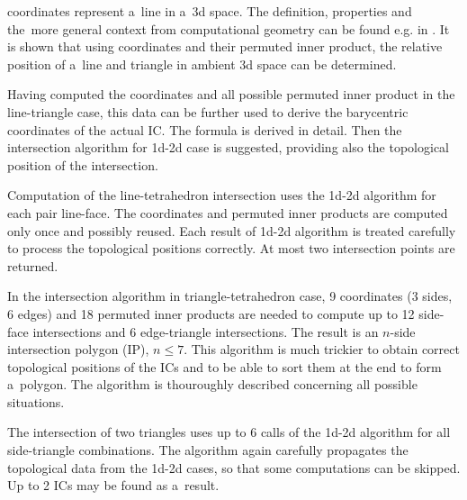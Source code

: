 \plucker coordinates represent a~line in a~3d space. The definition, properties and the~more general context from computational 
geometry can be found e.g. in \cite{joswig_plucker_2013}.
It is shown that using \plucker coordinates and their permuted inner product, the relative position of a~line and triangle
in ambient 3d space can be determined.


Having computed the \plucker coordinates and all possible permuted inner product in the line-triangle case,
this data can be further used to derive the barycentric coordinates of the actual IC.
The formula is derived in detail.
Then the intersection algorithm for 1d-2d case is suggested, providing also the topological position of the intersection.


Computation of the line-tetrahedron intersection uses the 1d-2d algorithm for each pair line-face.
The \plucker coordinates and permuted inner products are computed only once and possibly reused.
Each result of 1d-2d algorithm is treated carefully to process the topological positions correctly.
At most two intersection points are returned.


In the intersection algorithm in triangle-tetrahedron case, 9 \plucker coordinates (3 sides, 6 edges) and 18 permuted inner products
are needed to compute up to 12 side-face intersections and 6 edge-triangle intersections.
The result is an $n$-side intersection polygon (IP), $n\le 7$.
This algorithm is much trickier to obtain correct topological positions of the ICs and to be able to sort them at the end
to form a~polygon. The algorithm is thouroughly described concerning all possible situations.

The intersection of two triangles uses up to 6 calls of the 1d-2d algorithm for all side-triangle combinations.
The algorithm again carefully propagates the topological data from the 1d-2d cases, so that some computations can be skipped.
Up to 2 ICs may be found as a~result.

